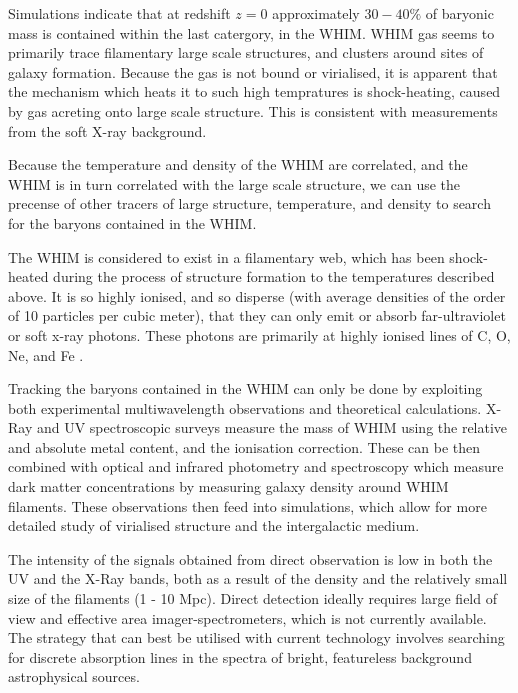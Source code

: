 Simulations \citep{1999ApJ...514....1C,2001ApJ...552..473D} indicate that at redshift $z=0$ approximately $30-40\%$ of baryonic mass is contained within the last catergory, in the WHIM. WHIM gas seems to primarily trace filamentary large scale structures, and clusters around sites of galaxy formation. Because the gas is not bound or virialised, it is apparent that the mechanism which heats it to such high tempratures is shock-heating, caused by gas acreting onto large scale structure. This is consistent with measurements from the soft X-ray background.

\par Because the temperature and density of the WHIM are correlated, and the WHIM is in turn correlated with the large scale structure, we can use the precense of other tracers of large structure, temperature, and density to search for the baryons contained in the WHIM.

\par The WHIM is considered to exist in a filamentary web, which has been shock-heated during the process of structure formation to the temperatures described above. It is so highly ionised, and so disperse (with average densities of the order of 10 particles per cubic meter), that they can only emit or absorb far-ultraviolet or soft x-ray photons. These photons are primarily at highly ionised lines of C, O, Ne, and Fe \citep{2006ApJ...650..573C}.

\par Tracking the baryons contained in the WHIM can only be done by exploiting both experimental multiwavelength observations and theoretical calculations. X-Ray and UV spectroscopic surveys measure the mass of WHIM using the relative and absolute metal content, and the ionisation correction. These can be then combined with optical and infrared photometry and spectroscopy which measure dark matter concentrations by measuring galaxy density around WHIM filaments. These observations then feed into simulations, which allow for more detailed study of virialised structure and the intergalactic medium.

\par The intensity of the signals obtained from direct observation is low in both the UV and the X-Ray bands, both as a result of the density and the relatively small size of the filaments (1 - 10 Mpc). Direct detection ideally requires large field of view and effective area imager-spectrometers, which is not currently available. The strategy that can best be utilised with current technology involves searching for discrete absorption lines in the spectra of bright, featureless background astrophysical sources. 

